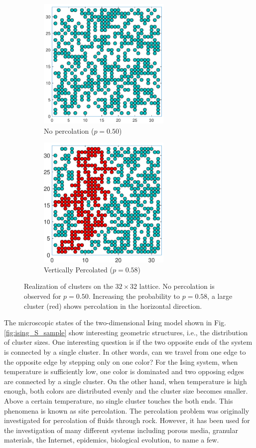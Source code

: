 \begin{figure}
	\centering
	\begin{subfigure}{0.45\textwidth}
		\centering
		\includegraphics[width=2.5in]{17.Metropolis/perc32a.pdf}
		\caption{No percolation ($p=0.50$)}
		\label{fig:perc32a}
	\end{subfigure}
	\begin{subfigure}{0.45\textwidth}
		\centering
		\includegraphics[width=2.5in]{17.Metropolis/perc32b.pdf}
		\caption{Vertically Percolated ($p=0.58$)}
		\label{fig:perc32b}
	\end{subfigure}
	\caption{Realization of clusters on the $32\times 32$ lattice.  No percolation is observed for $p=0.50$.  Increasing the probability to $p=0.58$, a large cluster (red) shows percolation in the horizontal direction.}
	\label{fig:perc32}
\end{figure}

The microscopic states of the two-dimensional Ising model shown in Fig. \ref{fig:ising_S_sample} show interesting geometric structures, i.e., the distribution of cluster sizes.   One interesting question is if the two opposite ends of the system is connected by a single cluster.  In other words, can we travel from one edge to the opposite edge by stepping only on one color?   For the Ising system, when temperature is sufficiently low, one color is dominated and two opposing edges are connected by a single cluster.  On the other hand, when temperature is high enough, both colors are distributed evenly and the cluster size becomes smaller. Above a certain temperature, no single cluster touches the both ends.  This phenomena is known as site percolation.\cite{percolation}  The percolation problem was originally investigated for percolation of fluids through rock.  However, it has been used for the investigation of many different systems including porous media, granular materials, the Internet, epidemics, biological evolution, to name a few.  

